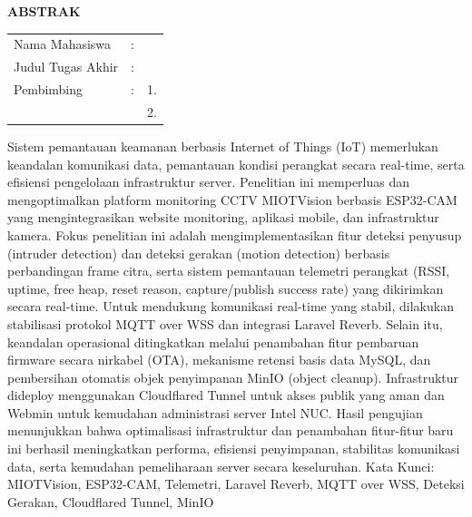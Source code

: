 \begin{center}
	\large\textbf{ABSTRAK}
\end{center}


\vspace{2ex}
\begingroup
\setlength{\tabcolsep}{0pt}

\noindent
\begin{tabularx}{\textwidth}{l >{\centering}m{2em} X}
	Nama Mahasiswa    & : & \name{}         \\
	
	Judul Tugas Akhir & : & \tatitle{}      \\
	
	Pembimbing        & : & 1. \advisor{}   \\
	&   & 2. \coadvisor{} \\
\end{tabularx} 
\endgroup

Sistem pemantauan keamanan berbasis Internet of Things (IoT) memerlukan keandalan komunikasi data, pemantauan kondisi perangkat secara real-time, serta efisiensi pengelolaan infrastruktur server. Penelitian ini memperluas dan mengoptimalkan platform monitoring CCTV MIOTVision berbasis ESP32-CAM yang mengintegrasikan website monitoring, aplikasi mobile, dan infrastruktur kamera. Fokus penelitian ini adalah mengimplementasikan fitur deteksi penyusup (intruder detection) dan deteksi gerakan (motion detection) berbasis perbandingan frame citra, serta sistem pemantauan telemetri perangkat (RSSI, uptime, free heap, reset reason, capture/publish success rate) yang dikirimkan secara real-time. Untuk mendukung komunikasi real-time yang stabil, dilakukan stabilisasi protokol MQTT over WSS dan integrasi Laravel Reverb. Selain itu, keandalan operasional ditingkatkan melalui penambahan fitur pembaruan firmware secara nirkabel (OTA), mekanisme retensi basis data MySQL, dan pembersihan otomatis objek penyimpanan MinIO (object cleanup). Infrastruktur dideploy menggunakan Cloudflared Tunnel untuk akses publik yang aman dan Webmin untuk kemudahan administrasi server Intel NUC. Hasil pengujian menunjukkan bahwa optimalisasi infrastruktur dan penambahan fitur-fitur baru ini berhasil meningkatkan performa, efisiensi penyimpanan, stabilitas komunikasi data, serta kemudahan pemeliharaan server secara keseluruhan.
Kata Kunci: MIOTVision, ESP32-CAM, Telemetri, Laravel Reverb, MQTT over WSS, Deteksi Gerakan, Cloudflared Tunnel, MinIO